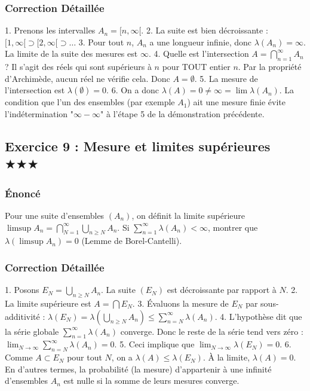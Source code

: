 \documentclass[11pt,a4paper]{article}
\begin{document}
\subsubsection*{Correction Détaillée}

1. Prenons les intervalles $A_n = [n, \infty[$.
2. La suite est bien décroissante : $[1, \infty[ \supset [2, \infty[ \supset \dots$
3. Pour tout $n$, $A_n$ a une longueur infinie, donc $\lambda(A_n) = \infty$. La limite de la suite des mesures est $\infty$.
4. Quelle est l'intersection $A = \bigcap_{n=1}^\infty A_n$ ? Il s'agit des réels qui sont supérieurs à $n$ pour TOUT entier $n$. Par la propriété d'Archimède, aucun réel ne vérifie cela. Donc $A = \emptyset$.
5. La mesure de l'intersection est $\lambda(\emptyset) = 0$.
6. On a donc $\lambda(A) = 0 \neq \infty = \lim \lambda(A_n)$.
La condition que l'un des ensembles (par exemple $A_1$) ait une mesure finie évite l'indétermination "$\infty - \infty$" à l'étape 5 de la démonstration précédente.


\subsection*{Exercice 9 : Mesure et limites supérieures \quad $\displaystyle \bigstar\bigstar\bigstar$}


\subsubsection*{Énoncé}

Pour une suite d'ensembles $(A_n)$, on définit la limite supérieure $\limsup A_n = \bigcap_{N=1}^\infty \bigcup_{n \ge N} A_n$. Si $\sum_{n=1}^\infty \lambda(A_n) < \infty$, montrer que $\lambda(\limsup A_n) = 0$ (Lemme de Borel-Cantelli).

\subsubsection*{Correction Détaillée}

1. Posons $E_N = \bigcup_{n \ge N} A_n$. La suite $(E_N)$ est décroissante par rapport à $N$.
2. La limite supérieure est $A = \bigcap E_N$.
3. Évaluons la mesure de $E_N$ par sous-additivité : $\lambda(E_N) = \lambda(\bigcup_{n \ge N} A_n) \le \sum_{n=N}^\infty \lambda(A_n)$.
4. L'hypothèse dit que la série globale $\sum_{n=1}^\infty \lambda(A_n)$ converge. Donc le reste de la série tend vers zéro : $\lim_{N \to \infty} \sum_{n=N}^\infty \lambda(A_n) = 0$.
5. Ceci implique que $\lim_{N \to \infty} \lambda(E_N) = 0$.
6. Comme $A \subset E_N$ pour tout $N$, on a $\lambda(A) \le \lambda(E_N)$.
À la limite, $\lambda(A) = 0$. En d'autres termes, la probabilité (la mesure) d'appartenir à une infinité d'ensembles $A_n$ est nulle si la somme de leurs mesures converge.
\end{document}
